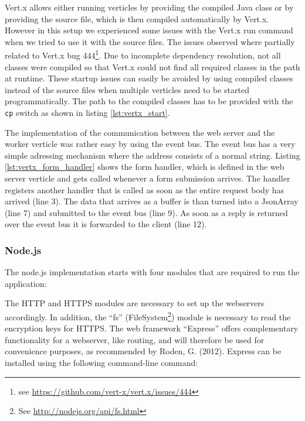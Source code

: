 

Vert.x allows either running verticles by providing the compiled Java class or by providing the
source file, which is then compiled automatically by Vert.x. However in this
setup we experienced some issues with the Vert.x run command when we tried to
use it with the source files. The issues observed where partially related to
Vert.x bug 444\footnote{see \url{https://github.com/vert-x/vert.x/issues/444}}.
Due to incomplete dependency resolution, not all classes were compiled so that
Vert.x could not find all required classes in the path at runtime.
These startup issues can easily be avoided by using compiled classes instead of
the source files when multiple verticles need to be started programmatically.
The path to the compiled classes has to be provided with the \texttt{cp} switch as
shown in listing \ref{lst:vertx_start}.





The implementation of the communication between the web server and the worker
verticle was rather easy by using the event bus. The event bus has a very
simple adressing mechanism where the address consists of a normal string.
Listing \ref{lst:vertx_form_handler} shows the form handler, which is defined
in the web server verticle and gets called whenever a form submission arrives.
The handler registers another handler that is called as soon as the entire
request body has arrived (line 3). The data that arrives as a buffer is than
turned into a JsonArray (line 7) and submitted to the event bus (line 9).
As soon as a reply is returned over the event bus it is forwarded to the client (line 12).



\subsubsection{Node.js}
\label{implementation_node}
The node.js implementation starts with four modules that are required to run the application:



The HTTP and HTTPS modules are necessary to set up the webservers accordingly. 
In addition, the “fs” (FileSystem\footnote{See \url{ http://nodejs.org/api/fs.html}}) module is necessary to read the encryption keys for HTTPS. The web framework “Express” offers complementary functionality for a webserver, like routing, 
and will therefore be used for convenience purposes, as recommended by Roden, G. (2012). 
Express can be installed using the following command-line command:\\

